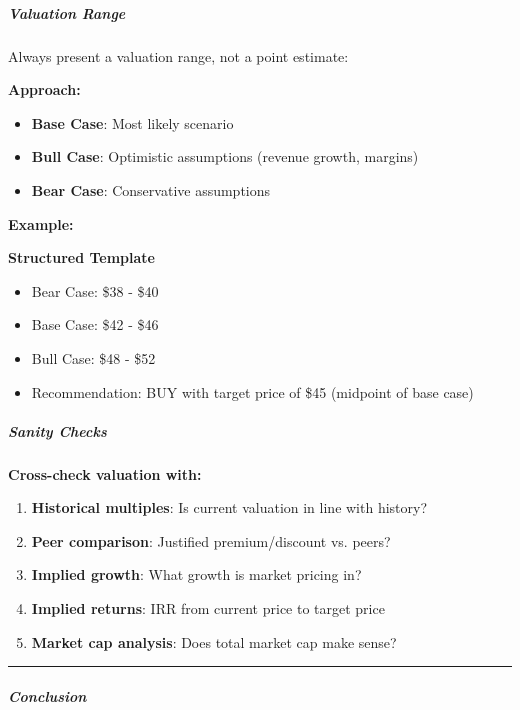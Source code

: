\documentclass[11pt]{article}
\begin{document}
\subparagraph{Valuation Range}\mbox{}\par

Always present a valuation range, not a point estimate:


\textbf{Approach:}

\begin{itemize}[leftmargin=*,itemsep=2pt,topsep=2pt]
\item {} \textbf{Base Case}: Most likely scenario
\item {} \textbf{Bull Case}: Optimistic assumptions (revenue growth, margins)
\item {} \textbf{Bear Case}: Conservative assumptions
\end{itemize}

\textbf{Example:}

\textbf{Structured Template}
\begin{itemize}[leftmargin=*,itemsep=2pt,topsep=2pt]
\item {} Bear Case: \$38 - \$40
\item {} Base Case: \$42 - \$46
\item {} Bull Case: \$48 - \$52
\item {} Recommendation: BUY with target price of \$45 (midpoint of base case)
\end{itemize}

\subparagraph{Sanity Checks}\mbox{}\par

\textbf{Cross-check valuation with:}

\begin{enumerate}[leftmargin=*,itemsep=2pt,topsep=2pt]
\item {} \textbf{Historical multiples}: Is current valuation in line with history?
\item {} \textbf{Peer comparison}: Justified premium/discount vs. peers?
\item {} \textbf{Implied growth}: What growth is market pricing in?
\item {} \textbf{Implied returns}: IRR from current price to target price
\item {} \textbf{Market cap analysis}: Does total market cap make sense?
\end{enumerate}

\vspace{0.5em}\hrule\vspace{0.5em}

\subparagraph{Conclusion}\mbox{}\par
\end{document}
